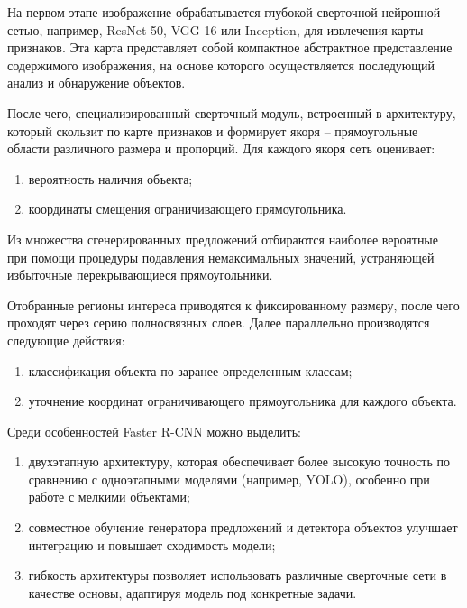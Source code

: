 На первом этапе изображение обрабатывается глубокой сверточной нейронной сетью, 
например, ResNet-50, VGG-16 или Inception, для извлечения карты признаков. Эта 
карта представляет собой компактное абстрактное представление содержимого 
изображения, на основе которого осуществляется последующий анализ и обнаружение 
объектов.

После чего, специализированный сверточный модуль, встроенный в архитектуру, 
который скользит по карте признаков и формирует якоря -- прямоугольные области 
различного размера и пропорций. Для каждого якоря сеть оценивает:

\begin{enumerate}
    \item вероятность наличия объекта;
    \item координаты смещения ограничивающего прямоугольника.
\end{enumerate}

Из множества сгенерированных предложений отбираются наиболее вероятные при помощи 
процедуры подавления немаксимальных значений, устраняющей избыточные 
перекрывающиеся прямоугольники.

Отобранные регионы интереса приводятся к фиксированному размеру, после чего 
проходят через серию полносвязных слоев. Далее параллельно производятся 
следующие действия:

\begin{enumerate}
    \item классификация объекта по заранее определенным классам;
    \item уточнение координат ограничивающего прямоугольника для каждого объекта.
\end{enumerate}

Среди особенностей Faster R-CNN можно выделить:

\begin{enumerate}
    \item двухэтапную архитектуру, которая обеспечивает более высокую точность 
    по сравнению с одноэтапными моделями (например, YOLO), особенно при работе с 
    мелкими объектами;
    \item совместное обучение генератора предложений и детектора объектов 
    улучшает интеграцию и повышает сходимость модели;
    \item гибкость архитектуры позволяет использовать различные сверточные сети в 
    качестве основы, адаптируя модель под конкретные задачи.
\end{enumerate}

